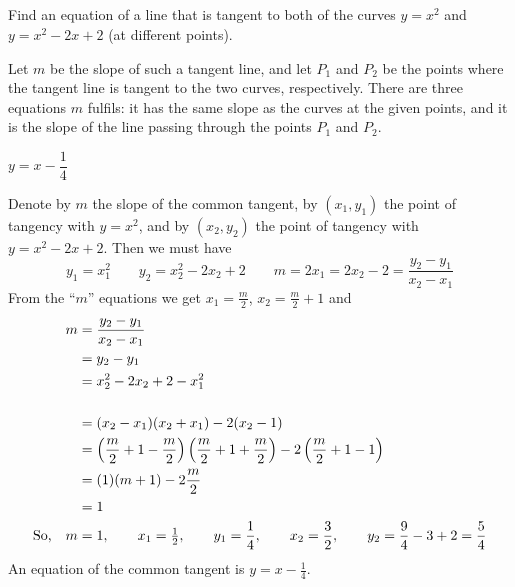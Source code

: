 \subsection*{\Application}



\begin{question}[2007H]
 Find an equation of a line that is tangent to both of the
curves $y = x^2$ and $y = x^2 - 2x + 2$ (at different points).
\end{question}
\begin{hint}
Let $m$ be the slope of such a tangent line, and let $P_1$ and $P_2$ be the points where the tangent line is tangent to the two curves, respectively. There are three equations $m$ fulfils: it has the same slope as the curves at the given points, and it is the slope of the line passing through the points $P_1$ and $P_2$.
\end{hint}
\begin{answer}
 $y=x-\dfrac{1}{4}$
\end{answer}
\begin{solution}
Denote by $m$ the slope of the common tangent, by $(x_1,y_1)$
the point of tangency with $y=x^2$, and by $(x_2,y_2)$ the point of tangency
with $y=x^2-2x+2$. Then we must have
$$
y_1=x_1^2\qquad
y_2=x_2^2-2x_2+2\qquad
m=2x_1=2x_2-2=\frac{y_2-y_1}{x_2-x_1}
$$
From the ``$m$'' equations we get $x_1=\frac{m}{2}$, $x_2=\frac{m}{2}+1$
and
\begin{align*}
m&=\frac{y_2-y_1}{x_2-x_1}\\
&=y_2-y_1\\
&=x_2^2-2x_2+2-x_1^2\\
\\& =(x_2-x_1)(x_2+x_1)-2(x_2-1)\\
&=\left(\frac{m}{2}+1-\frac{m}{2}\right)\left(\frac{m}{2}+1+\frac{m}{2}\right)
-2\left(\frac{m}{2}+1-1\right)
\\ &=(1)(m+1)-2\frac{m}{2}\\
 &=1\\
\mbox{So,}~~~m&=1,\qquad
x_1=\tfrac{1}{2},\qquad
y_1=\frac{1}{4},\qquad
x_2=\frac{3}{2},\qquad
y_2=\frac{9}{4}-3+2=\frac{5}{4}
\end{align*}
An equation of the common tangent is $y=x-\frac{1}{4}$.
\end{solution}



